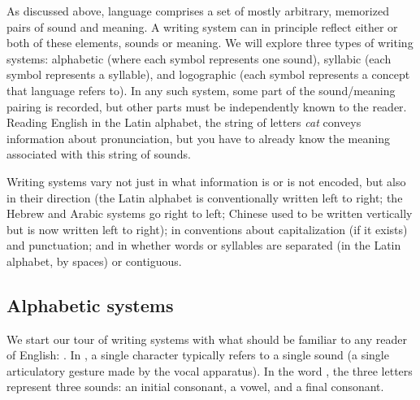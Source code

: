 As discussed above, language comprises a set of mostly arbitrary, memorized pairs of sound and meaning.  A writing system can in principle reflect either or both of these elements, sounds or meaning.  We will explore three types of writing systems: alphabetic (where each symbol represents one sound), syllabic (each symbol represents a syllable), and logographic (each symbol represents a concept that language refers to). 
In any such system, some part of the sound/meaning pairing is recorded, but other parts must be independently known to the reader.  Reading English in the Latin alphabet, the string of letters \textit{cat} conveys information about pronunciation, but you have to already know the meaning associated with this string of sounds.

Writing systems vary not just in what information is or is not encoded, but also in their direction (the Latin alphabet is conventionally written left to right; the Hebrew and Arabic systems go right to left; Chinese used to be written vertically but is now written left to right); in conventions about capitalization (if it exists) and punctuation; and in whether words or syllables are separated (in the Latin alphabet, by spaces) or contiguous.








\subsection{Alphabetic systems}
\label{sec:alpha}

We start our tour of writing systems with what should be familiar to
any reader of English: .  In , a
single character typically refers to a single sound (a single articulatory gesture made by the vocal apparatus).  In the word , the three letters represent three sounds: an initial consonant, a vowel, and a final consonant.

